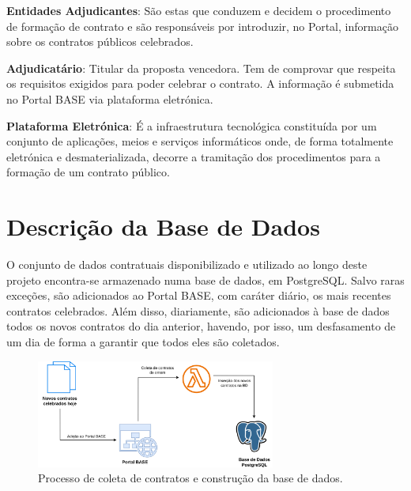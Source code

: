\begin{my_enumerate}
	\item \textbf{Entidades Adjudicantes}: São estas que conduzem e decidem o procedimento de formação de contrato e são responsáveis por introduzir, no Portal, informação sobre os contratos públicos celebrados. 
	
	\item \textbf{Adjudicatário}: Titular da proposta vencedora. Tem de comprovar que respeita os requisitos exigidos para poder celebrar o contrato. A informação é submetida no Portal BASE via plataforma eletrónica.
	
	\item \textbf{Plataforma Eletrónica}: É a infraestrutura tecnológica constituída por um conjunto de aplicações, meios e serviços informáticos onde, de forma totalmente eletrónica e desmaterializada, decorre a tramitação dos procedimentos para a formação de um contrato público. 
	
\end{my_enumerate}







\section{Descrição da Base de Dados}
\label{ch:variables}


O conjunto de dados contratuais disponibilizado e utilizado ao longo deste projeto encontra-se armazenado numa base de dados, em PostgreSQL. Salvo raras exceções, são adicionados ao Portal BASE, com caráter diário, os mais recentes contratos celebrados. Além disso, diariamente, são adicionados à base de dados todos os novos contratos do dia anterior, havendo, por isso, um desfasamento de um dia de forma a garantir que todos eles são coletados. 


\begin{figure}[H]
	\centering
	\includegraphics[width=0.7\textwidth]{imagens/portal_coleta.png}
	\caption{Processo de coleta de contratos e construção da base de dados.}
	\label{fig:processocoleta}
\end{figure}



